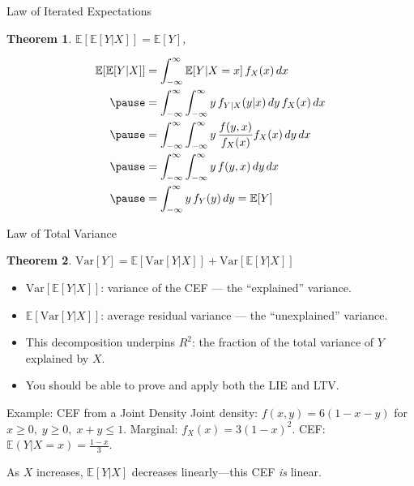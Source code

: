 \documentclass[aspectratio=169, handout, t]{beamer}
\newtheorem{thm}{Theorem}
\numberwithin{equation}{section}
\begin{document}
\begin{frame}{Law of Iterated Expectations}
\begin{thm}
$\mathbb{E}[\mathbb{E}[Y|X]]=\mathbb{E}[Y]$,
\end{thm}
\small
\vspace{-0.2cm}
\begin{align*}
\mathbb{E}[\mathbb{E}[Y|X]]&=\int_{-\infty}^\infty \mathbb{E}[Y|X=x]\,f_X(x)\,dx\\ \pause
&=\int_{-\infty}^\infty \int_{-\infty}^\infty y\,f_{Y|X}(y|x)\,dy\,f_X(x)\,dx\\\pause
&=\int_{-\infty}^\infty \int_{-\infty}^\infty y\,\frac{f(y,x)}{f_X(x)} f_X(x)\,dy\,dx\\\pause
&=\int_{-\infty}^\infty \int_{-\infty}^\infty y\,f(y,x)\,dy\,dx\\\pause
&=\int_{-\infty}^\infty y\, f_Y(y)\,dy=\mathbb{E}[Y]
\end{align*}
\end{frame}


\begin{frame}{Law of Total Variance}
\begin{thm}
$\text{Var}[Y]=\mathbb{E}[\text{Var}[Y|X]]+\text{Var}[\mathbb{E}[Y|X]]$
\end{thm}\pause
\begin{itemize}
\item $\text{Var}[\mathbb{E}[Y|X]]$: variance of the CEF --- the ``explained'' variance.
\item $\mathbb{E}[\text{Var}[Y|X]]$: average residual variance --- the ``unexplained'' variance.\pause
\item This decomposition underpins $R^2$: the fraction of the total variance of $Y$ explained by $X$.
\item You should be able to prove and apply both the LIE and LTV.
\end{itemize}
\end{frame}


\begin{frame}{Example: CEF from a Joint Density}
\small
Joint density: $f(x,y)=6(1 - x - y)$ for $x\geq 0,\;y\geq 0,\;x+y\leq 1.$
Marginal: $f_X(x)=3(1 - x)^2$.
CEF: $\mathbb{E}(Y|X=x)=\frac{1-x}{3}$.
\begin{center}
\end{center}
As $X$ increases, $\mathbb{E}[Y|X]$ decreases linearly---this CEF \emph{is} linear.
\end{frame}
\end{document}

